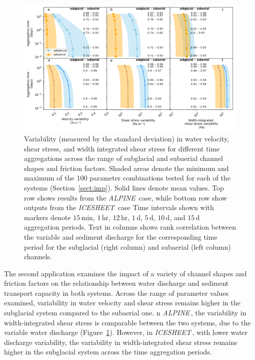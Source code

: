 \documentclass[draft]{agujournal2019}
\newcommand{\alpine}{\textit{ALPINE}\,}
\newcommand{\icesheet}{\textit{ICESHEET}\,}
\newcommand{\unit}[1]{$\mathrm{#1}$}
\begin{document}
\begin{figure}[h]
  \centering
    \includegraphics[width=0.9\linewidth]{Fig4.png}
    \caption{Variability (measured by the standard deviation) in water velocity, shear stress, and width integrated shear stress for different time aggregations across the range of subglacial and subaerial channel shapes and friction factors.
      Shaded areas denote the minimum and maximum of the $100$ parameter combinations tested for each of the systems (Section~\ref{sect:imp}).
      Solid lines denote  mean values.
      Top row shows results from the \alpine{} case, while bottom row show outputs from the \icesheet{} case
      Time intervals shown with markers denote $15$\,\unit{min}, $1$\,\unit{hr}, $12$\,\unit{hr}, $1$\,\unit{d}, $5$\,\unit{d}, $10$\,\unit{d}, and $15$\,\unit{d} aggregation periods.
      Text in columns shows rank correlation between the variable and sediment discharge for the corresponding time period for the subglacial (right column) and subaerial (left column) channels.
    }
    \label{fig:multi_run}
  \end{figure}

The second application examines the impact of a variety of channel shapes and friction factors on the relationship between water discharge and sediment transport capacity in both systems.
Across the range of parameter values examined, variability in water velocity and shear stress remains higher in the subglacial system compared to the subaerial one.
n \alpine{}, the variability in width-integrated shear stress is comparable between the two systems, due to the variable water discharge (Figure~\ref{fig:multi_run}).
 However, in \icesheet{}, with lower water discharge variability, the variability in width-integrated shear stress remains higher in the subglacial system across the time aggregation periods.
\end{document}
